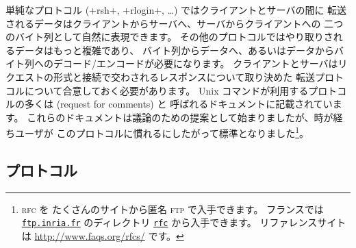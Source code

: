 単純なプロトコル (\ml+rsh+, \ml+rlogin+, \ldots) ではクライアントとサーバの間に
転送されるデータはクライアントからサーバへ、サーバからクライアントへの
二つのバイト列として自然に表現できます。
その他のプロトコルではやり取りされるデータはもっと複雑であり、
バイト列からデータへ、あるいはデータからバイト列へのデコード/エンコードが必要になります。
クライアントとサーバはリクエストの形式と接続で交わされるレスポンスについて取り決めた
転送プロトコルについて合意しておく必要があります。
Unix コマンドが利用するプロトコルの多くは  (request for comments) と
呼ばれるドキュメントに記載されています。
これらのドキュメントは議論のための提案として始まりましたが、時が経ちユーザが
このプロトコルに慣れるにしたがって標準となりました\footnote{\textsc{rfc} を
  たくさんのサイトから匿名 \textsc{ftp} で入手できます。
  フランスでは \href{ftp://ftp.inria.fr}{\texttt{ftp.inria.fr}} のディレクトリ
  \href{ftp://ftp.inria.fr/pub/rfc/}{\texttt{rfc}} から入手できます。
  リファレンスサイトは \url{http://www.faqs.org/rfcs/} です。}。

\subsection*{ プロトコル}

